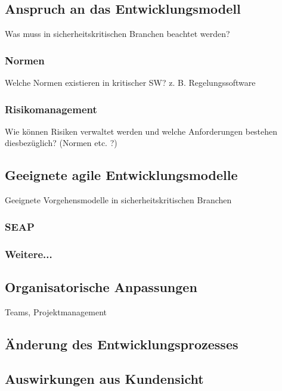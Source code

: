 \subsection{Anspruch an das Entwicklungsmodell}

Was muss in sicherheitskritischen Branchen beachtet werden?

\subsubsection{Normen}

Welche Normen existieren in kritischer SW? z. B. Regelungssoftware

\subsubsection{Risikomanagement}

Wie können Risiken verwaltet werden und welche Anforderungen bestehen diesbezüglich? (Normen etc. ?)

\subsection{Geeignete agile Entwicklungsmodelle}

Geeignete Vorgehensmodelle in sicherheitskritischen Branchen

\subsubsection{SEAP}

\subsubsection{Weitere...}


\subsection{Organisatorische Anpassungen}

Teams, Projektmanagement

\subsection{Änderung des Entwicklungsprozesses}

\subsection{Auswirkungen aus Kundensicht}




